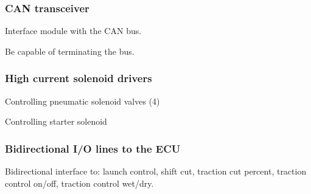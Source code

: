 \subsubsection{CAN transceiver}

Interface module with the CAN bus.

Be capable of terminating the bus.


\subsubsection{High current solenoid drivers}

Controlling pneumatic solenoid valves (4)

Controlling starter solenoid


\subsubsection{Bidirectional I/O lines to the ECU}

Bidirectional interface to: launch control, shift cut, traction cut
percent, traction control on/off, traction control wet/dry.